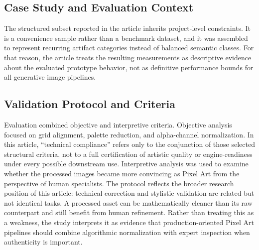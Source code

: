 \documentclass[runningheads]{llncs}
\begin{document}
\subsection{Case Study and Evaluation Context}

The structured subset reported in the article inherits project-level constraints. It is a convenience sample rather than a benchmark dataset, and it was assembled to represent recurring artifact categories instead of balanced semantic classes. For that reason, the article treats the resulting measurements as descriptive evidence about the evaluated prototype behavior, not as definitive performance bounds for all generative image pipelines.

\subsection{Validation Protocol and Criteria}

Evaluation combined objective and interpretive criteria. Objective analysis focused on grid alignment, palette reduction, and alpha-channel normalization. In this article, ``technical compliance'' refers only to the conjunction of those selected structural criteria, not to a full certification of artistic quality or engine-readiness under every possible downstream use. Interpretive analysis was used to examine whether the processed images became more convincing as Pixel Art from the perspective of human specialists. The protocol reflects the broader research position of this article: technical correction and stylistic validation are related but not identical tasks. A processed asset can be mathematically cleaner than its raw counterpart and still benefit from human refinement. Rather than treating this as a weakness, the study interprets it as evidence that production-oriented Pixel Art pipelines should combine algorithmic normalization with expert inspection when authenticity is important.
\end{document}
